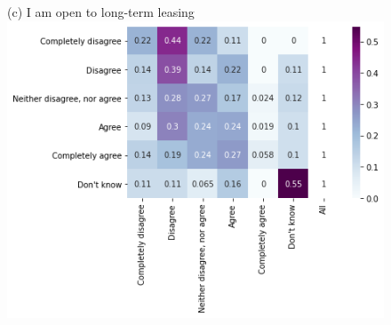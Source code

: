 \documentclass[12pt]{article}
\begin{document}
\begin{figure}[h!!]
\begin{minipage}[h!!]{0.32\textwidth}
	\end{minipage}
	\begin{minipage}[h!!]{0.32\textwidth}  
		\centering\footnotesize{(c) I am open to long-term leasing}
		\includegraphics[width=1\textwidth]{../codding_data/results/liss/conditional_heatmap183_141labels0.png}
	\end{minipage}
\end{figure}

\newpage
\end{document}
